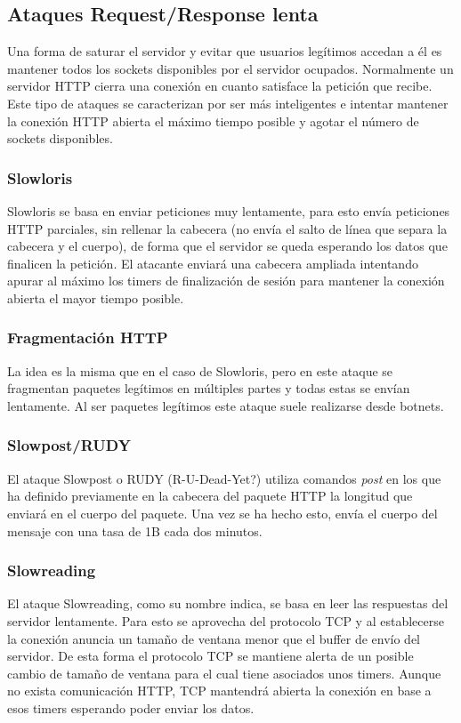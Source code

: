 \subsection{Ataques Request/Response lenta}
Una forma de saturar el servidor y evitar que usuarios legítimos accedan a él es mantener todos los sockets disponibles por el servidor ocupados. Normalmente un servidor HTTP cierra una conexión en cuanto satisface la petición que recibe. Este tipo de ataques se caracterizan por ser más inteligentes e intentar mantener la conexión HTTP abierta el máximo tiempo posible y agotar el número de sockets disponibles. 

\subsubsection{Slowloris\cite{soa-dos}}
Slowloris se basa en enviar peticiones muy lentamente, para esto envía peticiones HTTP parciales, sin rellenar la cabecera (no envía el salto de línea que separa la cabecera y el cuerpo), de forma que el servidor se queda esperando los datos que finalicen la petición. El atacante enviará una cabecera ampliada intentando apurar al máximo los timers de finalización de sesión para mantener la conexión abierta el mayor tiempo posible.

\subsubsection{Fragmentación HTTP\cite{soa-dos}}
La idea es la misma que en el caso de Slowloris, pero en este ataque se fragmentan paquetes legítimos en múltiples partes y todas estas se envían lentamente. Al ser paquetes legítimos este ataque suele realizarse desde botnets.

\subsubsection{Slowpost/RUDY\cite{soa-dos}}
El ataque Slowpost o RUDY (R-U-Dead-Yet?) utiliza comandos \textit{post} en los que ha definido previamente en la cabecera del paquete HTTP la longitud que enviará en el cuerpo del paquete. Una vez se ha hecho esto, envía el cuerpo del mensaje con una tasa de 1B cada dos minutos. 

\subsubsection{Slowreading\cite{soa-dos}}
El ataque Slowreading, como su nombre indica, se basa en leer las respuestas del servidor lentamente. Para esto se aprovecha del protocolo TCP y al establecerse la conexión anuncia un tama\~no de ventana menor que el buffer de envío del servidor. De esta forma el protocolo TCP se mantiene alerta de un posible cambio de tama\~no de ventana para el cual tiene asociados unos timers. Aunque no exista comunicación HTTP, TCP mantendrá abierta la conexión en base a esos timers esperando poder enviar los datos.

